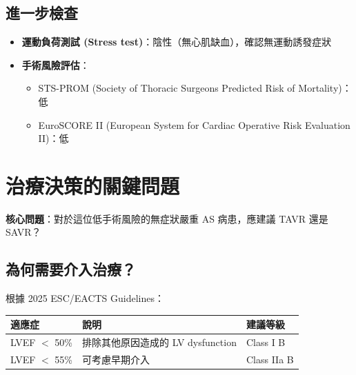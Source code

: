 \documentclass[12pt,a4paper]{article}
\begin{document}

\subsection{進一步檢查}

\begin{itemize}[leftmargin=*]
    \item \textbf{運動負荷測試 (Stress test)}：陰性（無心肌缺血），確認無運動誘發症狀
    \item \textbf{手術風險評估}：
    \begin{itemize}
        \item STS-PROM (Society of Thoracic Surgeons Predicted Risk of Mortality)：低
        \item EuroSCORE II (European System for Cardiac Operative Risk Evaluation II)：低
    \end{itemize}
\end{itemize}

\section{治療決策的關鍵問題}

\begin{importantbox}
\textbf{核心問題}：對於這位低手術風險的無症狀嚴重 AS 病患，應建議 TAVR 還是 SAVR？
\end{importantbox}

\subsection{為何需要介入治療？}

根據 2025 ESC/EACTS Guidelines：

\begin{longtable}{p{3cm}p{8cm}p{3cm}}
\toprule
\textbf{適應症} & \textbf{說明} & \textbf{建議等級} \\
\midrule
\endfirsthead
LVEF $<$ 50\% & 排除其他原因造成的 LV dysfunction & Class I B \\
\midrule
LVEF $<$ 55\% & 可考慮早期介入 & Class IIa B \\
\bottomrule
\end{longtable}
\end{document}

